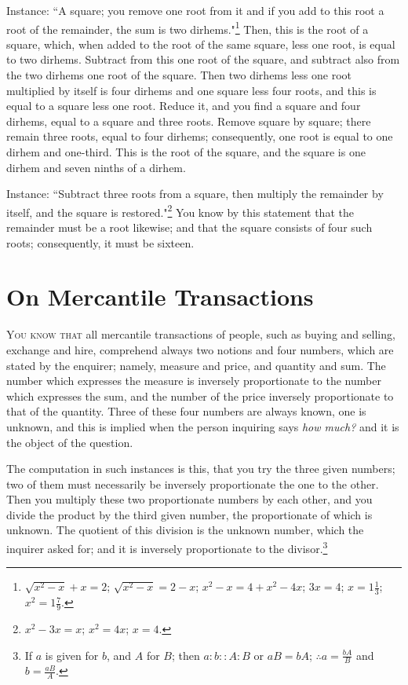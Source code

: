 Instance: ``A square; you remove one root from it and if you add to this root a root of the remainder, the sum is two dirhems."\footnote{$\sqrt{x^2 - x} + x = 2$; $\sqrt{x^2 - x} = 2 - x$; $x^2 - x = 4 + x^2 - 4x$; $3x = 4$; $x = 1\frac{1}{3}$; $x^2 = 1\frac{7}{9}$.} Then, this is the root of a square, which, when added to the root of the same square, less one root, is equal to two dirhems. Subtract from this one root of the square, and subtract also from the two dirhems one root of the square. Then two dirhems less one root multiplied by itself is four dirhems and one square less four roots, and this is equal to a square less one root. Reduce it, and you find a square and four dirhems, equal to a square and three roots. Remove square by square; there remain three roots, equal to four dirhems; consequently, one root is equal to one dirhem and one-third. This is the root of the square, and the square is one dirhem and seven ninths of a dirhem.

Instance: ``Subtract three roots from a square, then multiply the remainder by itself, and the square is restored."\footnote{$x^2 - 3x = x$; $x^2 = 4x$; $x = 4$.} You know by this statement that the remainder must be a root likewise; and that the square consists of four such roots; consequently, it must be sixteen.

\clearpage

\section*{On Mercantile Transactions}

\lettrine{Y}{ou know that} all mercantile transactions of people, such as buying and selling, exchange and hire, comprehend always two notions and four numbers, which are stated by the enquirer; namely, measure and price, and quantity and sum. The number which expresses the measure is inversely proportionate to the number which expresses the sum, and the number of the price inversely proportionate to that of the quantity. Three of these four numbers are always known, one is unknown, and this is implied when the person inquiring says \textit{how much?} and it is the object of the question.

The computation in such instances is this, that you try the three given numbers; two of them must necessarily be inversely proportionate the one to the other. Then you multiply these two proportionate numbers by each other, and you divide the product by the third given number, the proportionate of which is unknown. The quotient of this division is the unknown number, which the inquirer asked for; and it is inversely proportionate to the divisor.\footnote{If $a$ is given for $b$, and $A$ for $B$; then $a : b :: A : B$ or $aB = bA$; $\therefore a = \frac{bA}{B}$ and $b = \frac{aB}{A}$.}

